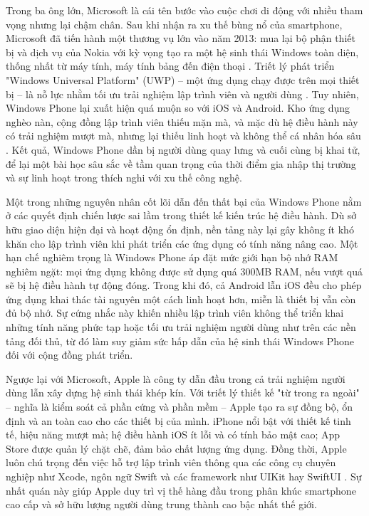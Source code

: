         \vspace{0.5em}
    
      \hspace*{0.8cm}Trong ba ông lớn, Microsoft là cái tên bước vào cuộc chơi di động với nhiều tham vọng nhưng lại chậm chân. Sau khi nhận ra xu thế bùng nổ của smartphone, Microsoft đã tiến hành một thương vụ lớn vào năm 2013: mua lại bộ phận thiết bị và dịch vụ của Nokia với kỳ vọng tạo ra một hệ sinh thái Windows toàn diện, thống nhất từ máy tính, máy tính bảng đến điện thoại \cite{msft-nokia}. Triết lý phát triển "Windows Universal Platform" (UWP) – một ứng dụng chạy được trên mọi thiết bị – là nỗ lực nhằm tối ưu trải nghiệm lập trình viên và người dùng \cite{uwp-overview}. Tuy nhiên, Windows Phone lại xuất hiện quá muộn so với iOS và Android. Kho ứng dụng nghèo nàn, cộng đồng lập trình viên thiếu mặn mà, và mặc dù hệ điều hành này có trải nghiệm mượt mà, nhưng lại thiếu linh hoạt và không thể cá nhân hóa sâu \cite{windows-phone-fail}. Kết quả, Windows Phone dần bị người dùng quay lưng và cuối cùng bị khai tử, để lại một bài học sâu sắc về tầm quan trọng của thời điểm gia nhập thị trường và sự linh hoạt trong thích nghi với xu thế công nghệ.

      \vspace{0.5em}

      \hspace*{0.8cm}Một trong những nguyên nhân cốt lõi dẫn đến thất bại của Windows Phone nằm ở các quyết định chiến lược sai lầm trong thiết kế kiến trúc hệ điều hành. Dù sở hữu giao diện hiện đại và hoạt động ổn định, nền tảng này lại gây không ít khó khăn cho lập trình viên khi phát triển các ứng dụng có tính năng nâng cao. Một hạn chế nghiêm trọng là Windows Phone áp đặt mức giới hạn bộ nhớ RAM nghiêm ngặt: mọi ứng dụng không được sử dụng quá 300MB RAM, nếu vượt quá sẽ bị hệ điều hành tự động đóng. Trong khi đó, cả Android lẫn iOS đều cho phép ứng dụng khai thác tài nguyên một cách linh hoạt hơn, miễn là thiết bị vẫn còn đủ bộ nhớ. Sự cứng nhắc này khiến nhiều lập trình viên không thể triển khai những tính năng phức tạp hoặc tối ưu trải nghiệm người dùng như trên các nền tảng đối thủ, từ đó làm suy giảm sức hấp dẫn của hệ sinh thái Windows Phone đối với cộng đồng phát triển.
    
      \vspace{0.5em}
    
      \hspace*{0.8cm}Ngược lại với Microsoft, Apple là công ty dẫn đầu trong cả trải nghiệm người dùng lẫn xây dựng hệ sinh thái khép kín. Với triết lý thiết kế "từ trong ra ngoài" – nghĩa là kiểm soát cả phần cứng và phần mềm – Apple tạo ra sự đồng bộ, ổn định và an toàn cao cho các thiết bị của mình. iPhone nổi bật với thiết kế tinh tế, hiệu năng mượt mà; hệ điều hành iOS ít lỗi và có tính bảo mật cao; App Store được quản lý chặt chẽ, đảm bảo chất lượng ứng dụng. Đồng thời, Apple luôn chú trọng đến việc hỗ trợ lập trình viên thông qua các công cụ chuyên nghiệp như Xcode, ngôn ngữ Swift và các framework như UIKit hay SwiftUI \cite{apple-devtools}. Sự nhất quán này giúp Apple duy trì vị thế hàng đầu trong phân khúc smartphone cao cấp và sở hữu lượng người dùng trung thành cao bậc nhất thế giới.
    

